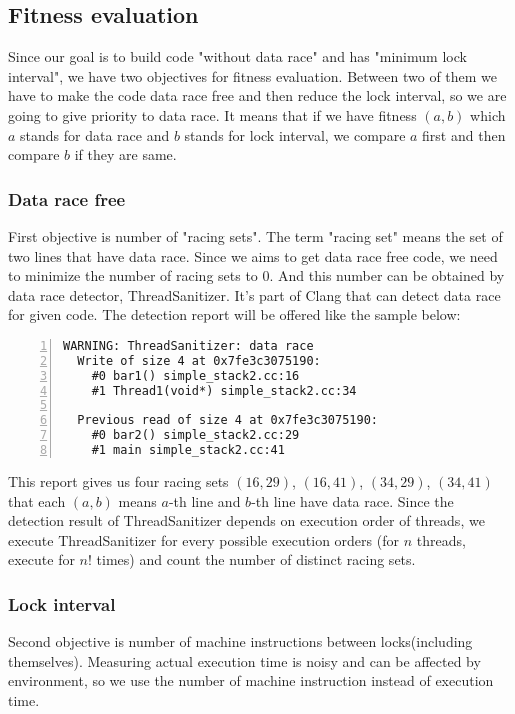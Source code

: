 \subsection{Fitness evaluation}
Since our goal is to build code "without data race" and has "minimum lock interval", we have two objectives for fitness evaluation. Between two of them we have to make the code data race free and then reduce the lock interval, so we are going to give priority to data race. It means that if we have fitness $(a, b)$ which $a$ stands for data race and $b$ stands for lock interval, we compare $a$ first and then compare $b$ if they are same.

\subsubsection{Data race free}
First objective is number of "racing sets". The term "racing set" means the set of two lines that have data race. Since we aims to get data race free code, we need to minimize the number of racing sets to 0. And this number can be obtained by data race detector, ThreadSanitizer. It's part of Clang that can detect data race for given code. The detection report will be offered like the sample below:

\begin{lstlisting}[frame=tb, xleftmargin=2em, framexleftmargin=1.5em, numbers=left]
WARNING: ThreadSanitizer: data race
  Write of size 4 at 0x7fe3c3075190:
    #0 bar1() simple_stack2.cc:16
    #1 Thread1(void*) simple_stack2.cc:34

  Previous read of size 4 at 0x7fe3c3075190:
    #0 bar2() simple_stack2.cc:29
    #1 main simple_stack2.cc:41
\end{lstlisting}

This report gives us four racing sets $(16, 29)$, $(16, 41)$, $(34, 29)$, $(34, 41)$ that each $(a, b)$ means $a$-th line and $b$-th line have data race. Since the detection result of ThreadSanitizer depends on execution order of threads, we execute ThreadSanitizer for every possible execution orders (for $n$ threads, execute for $n!$ times) and count the number of distinct racing sets.
 
\subsubsection{Lock interval}
Second objective is number of machine instructions between locks(including themselves). Measuring actual execution time is noisy and can be affected by environment, so we use the number of machine instruction instead of execution time.

